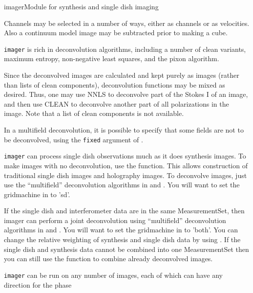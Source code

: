 \begin{ahmodule}{imager}{Module for synthesis and single dish imaging}
\begin{description}
Channels may be selected in a number of ways, either as channels
or as velocities. Also a continuum model image may be subtracted 
prior to making a cube.
\protect
\item[Many different deconvolution algorithms] {\tt imager} is rich in
deconvolution algorithms, including a number of clean variants,
maximum entropy, non-negative least squares, and the pixon algorithm.
\item[Mixing of deconvolution functions] Since the deconvolved images
are calculated and kept purely as images (rather than lists of clean
components), deconvolution functions may be mixed as desired. Thus,
one may use NNLS to deconvolve part of the Stokes I of an image, 
and then use CLEAN to deconvolve another part of all polarizations
in the image. Note that a list of clean components is not available.
\item[Ability to fix model images] In a multifield deconvolution,
it is possible to specify that some fields are not to be deconvolved,
using the {\tt fixed} argument of .
\item[Single dish imaging] {\tt imager} can process single dish
observations much as it does synthesis images. To make images with no
deconvolution, use the 
function. This allows construction of traditional single dish images
and holography images. To deconvolve images, just use the
``multifield'' deconvolution algorithms in
 and 
. You will want to set the gridmachine
in  to 'sd'.
\item[Combination of single dish and synthesis data] If the single
dish and interferometer data are in the same MeasurementSet, then
imager can perform a joint deconvolution using
``multifield'' deconvolution algorithms in
 and 
. You will want to set the gridmachine
in  to 'both'. You can
change the relative weighting of synthesis and single dish data by
using .
If the single dish and synthesis data cannot be combined into
one MeasurementSet then you can still use the
 function to combine already
deconvolved images.
\item[Multi-field processing] {\tt imager} can be run on any number
of images, each of which can have any direction for the phase

\end{description}
\end{ahmodule}
